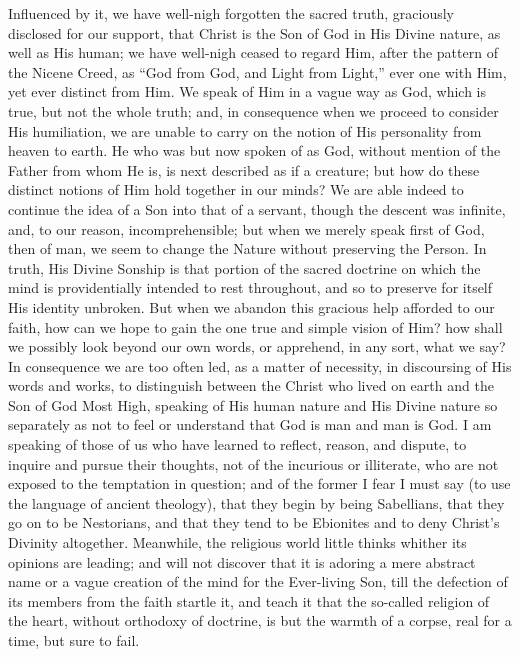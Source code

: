 Influenced by it, we have well-nigh forgotten the sacred truth,
graciously disclosed for our support, that Christ is the Son of God in
His Divine nature, as well as His human; we have well-nigh ceased to
regard Him, after the pattern of the Nicene Creed, as ``God from
God, and Light from Light,'' ever one with Him, yet ever distinct
from Him. We speak of Him in a vague way as God, which is true, but
not the whole truth; and, in consequence when we proceed to consider
His humiliation, we are unable to carry on the notion of His
personality from heaven to earth. He who was but now spoken of as God,
without mention of the Father from whom He is, is next described as if
a creature; but how do these distinct notions of Him hold together in
our minds? We are able indeed to continue the idea of a Son into that
of a servant, though the descent was infinite, and, to our reason,
incomprehensible; but when we merely speak first of God, then of man,
we seem to change the Nature without preserving the Person. In truth,
His Divine Sonship is that portion of the sacred doctrine on which the
mind is providentially intended to rest throughout, and so to preserve
for itself His identity unbroken. But when we abandon this gracious
help afforded to our faith, how can we hope to gain the one true and
simple vision of Him? how shall we possibly look beyond our own words,
or apprehend, in any sort, what we say? In consequence we are too
often led, as a matter of necessity, in discoursing of His words and
works, to distinguish between the Christ who lived on earth and the
Son of God Most High, speaking of His human nature and His Divine
nature so separately as not to feel or understand that God is man and
man is God. I am speaking of those of us who have learned to reflect,
reason, and dispute, to inquire and pursue their thoughts, not of the
incurious or illiterate, who are not exposed to the temptation in
question; and of the former I fear I must say (to use the language of
ancient theology), that they begin by being Sabellians, that they go
on to be Nestorians, and that they tend to be Ebionites and to deny
Christ's Divinity altogether. Meanwhile, the religious world little
thinks whither its opinions are leading; and will not discover that it
is adoring a mere abstract name or a vague creation of the mind for
the Ever-living Son, till the defection of its members from the faith
startle it, and teach it that the so-called religion of the heart,
without orthodoxy of doctrine, is but the warmth of a corpse, real for
a time, but sure to fail.


